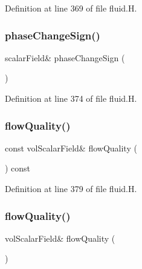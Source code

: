 Definition at line 369 of file fluid.\+H.

\mbox{\label{classFoam_1_1fluid_a8b1b897b11983b5506f2c0785ae070c7}} 
\subsubsection{\texorpdfstring{phase\+Change\+Sign()}{phaseChangeSign()}\hspace{0.1cm}{\footnotesize\ttfamily [2/2]}}
{\footnotesize\ttfamily scalar\+Field\& phase\+Change\+Sign (\begin{DoxyParamCaption}{ }\end{DoxyParamCaption})\hspace{0.3cm}{\ttfamily [inline]}}



Definition at line 374 of file fluid.\+H.

\mbox{\label{classFoam_1_1fluid_af0f64956745ae43e76b72159b00e3072}} 
\subsubsection{\texorpdfstring{flow\+Quality()}{flowQuality()}\hspace{0.1cm}{\footnotesize\ttfamily [1/2]}}
{\footnotesize\ttfamily const vol\+Scalar\+Field\& flow\+Quality (\begin{DoxyParamCaption}{ }\end{DoxyParamCaption}) const\hspace{0.3cm}{\ttfamily [inline]}}



Definition at line 379 of file fluid.\+H.

\mbox{\label{classFoam_1_1fluid_a3f7eb220bdef287f413bda3214570fa6}} 
\subsubsection{\texorpdfstring{flow\+Quality()}{flowQuality()}\hspace{0.1cm}{\footnotesize\ttfamily [2/2]}}
{\footnotesize\ttfamily vol\+Scalar\+Field\& flow\+Quality (\begin{DoxyParamCaption}{ }\end{DoxyParamCaption})\hspace{0.3cm}{\ttfamily [inline]}}



